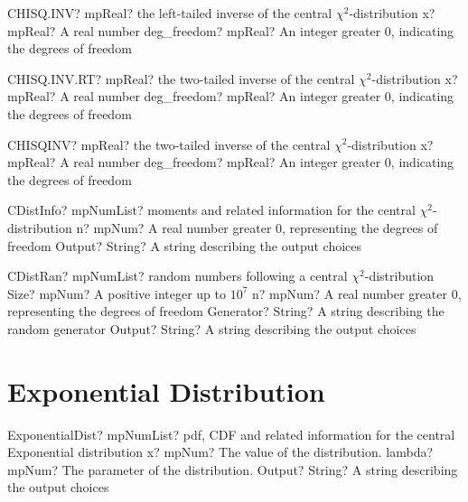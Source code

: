 \documentclass[12pt,a4paper,openany]{book}
\begin{document}
\begin{mpFunctionsExtract}
\mpWorksheetFunctionTwoNotImplemented
{CHISQ.INV? mpReal? the left-tailed inverse of the central $\chi^2$-distribution}
{x? mpReal? A real number}
{deg\_freedom? mpReal? An integer  greater 0, indicating the degrees of freedom}
\end{mpFunctionsExtract}

\begin{mpFunctionsExtract}
\mpWorksheetFunctionTwoNotImplemented
{CHISQ.INV.RT? mpReal? the two-tailed inverse of the central $\chi^2$-distribution}
{x? mpReal? A real number}
{deg\_freedom? mpReal? An integer  greater 0, indicating the degrees of freedom}
\end{mpFunctionsExtract}

\begin{mpFunctionsExtract}
\mpWorksheetFunctionTwoNotImplemented
{CHISQINV? mpReal? the two-tailed inverse of the central $\chi^2$-distribution}
{x? mpReal? A real number}
{deg\_freedom? mpReal? An integer  greater 0, indicating the degrees of freedom}
\end{mpFunctionsExtract}

\begin{mpFunctionsExtract}
\mpFunctionTwoNotImplemented
{CDistInfo? mpNumList? moments and related information for the central $\chi^2$-distribution}
{n? mpNum? A real number greater 0, representing the degrees of freedom}
{Output? String? A string describing the output choices}
\end{mpFunctionsExtract}

\begin{mpFunctionsExtract}
\mpFunctionFourNotImplemented
{CDistRan? mpNumList? random numbers following a central $\chi^2$-distribution}
{Size? mpNum? A positive integer up to $10^7$}
{n? mpNum? A real number greater 0, representing the degrees of freedom}
{Generator? String? A string describing the random generator}
{Output? String? A string describing the output choices}
\end{mpFunctionsExtract}

\section{Exponential Distribution}

\begin{mpFunctionsExtract}
\mpFunctionThreeNotImplemented
{ExponentialDist? mpNumList? pdf, CDF and related information for the central Exponential distribution}
{x? mpNum? The value of the distribution.}
{lambda? mpNum? The parameter of the distribution.}
{Output? String? A string describing the output choices}
\end{mpFunctionsExtract}
\end{document}
